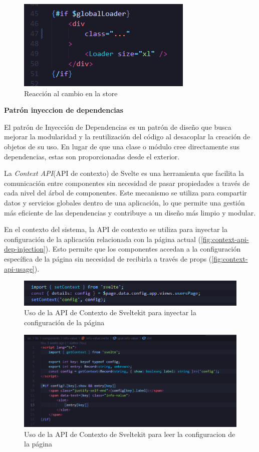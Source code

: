 \begin{figure}[h]
    \centering
    \includegraphics{images/code/loader-store-reaction.png}
    \caption{Reacción al cambio en la store}
    \label{fig:loader-store-reaction}
\end{figure}

\textbf{Patrón inyeccion de dependencias}

El patrón de Inyección de Dependencias es un patrón de diseño que busca mejorar la modularidad y la reutilización del código al desacoplar la creación de objetos de su uso. En lugar de que una clase o módulo cree directamente sus dependencias, estas son proporcionadas desde el exterior.

La \textit{Context API}(API de contexto) de Svelte es una herramienta que facilita la comunicación entre componentes sin necesidad de pasar propiedades a través de cada nivel del árbol de componentes. Este mecanismo se utiliza para compartir datos y servicios globales dentro de una aplicación, lo que permite una gestión más eficiente de las dependencias y contribuye a un diseño más limpio y modular.

En el contexto del sistema, la API de contexto se utiliza para inyectar la configuración de la aplicación relacionada con la página actual (\autoref{fig:context-api-dep-injection}). Esto permite que los componentes accedan a la configuración específica de la página sin necesidad de recibirla a través de props (\autoref{fig:context-api-usage}).

\begin{figure}[h]
    \centering
    \includegraphics[width=\linewidth]{images/code/context-api-dep-injection.png}
    \caption{Uso de la API de Contexto de Sveltekit para inyectar la configuración de la página}
    \label{fig:context-api-dep-injection}
\end{figure}

\begin{figure}[h]
    \centering
    \includegraphics[width=\linewidth]{images/code/context-api-usage.png}
    \caption{Uso de la API de Contexto de Sveltekit para leer la configuracion de la página}
    \label{fig:context-api-usage}
\end{figure}